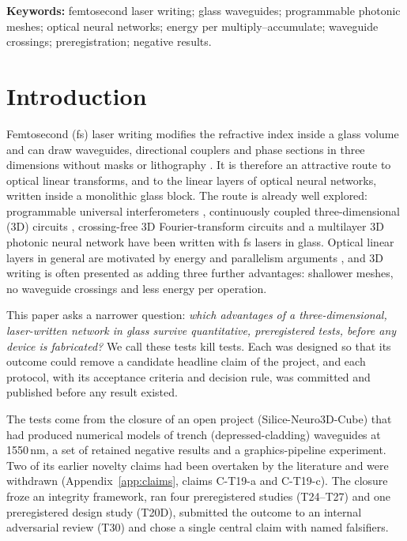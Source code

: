 \documentclass[11pt,a4paper]{article}
\begin{document}
\begin{titlepage}
\vspace{0.5cm}
\noindent\textbf{Keywords:} femtosecond laser writing; glass waveguides; programmable photonic meshes; optical neural networks; energy per multiply--accumulate; waveguide crossings; preregistration; negative results.
\end{titlepage}

\setcounter{tocdepth}{1}
\tableofcontents
\clearpage

\section{Introduction}
\label{sec:intro}

Femtosecond (fs) laser writing modifies the refractive index inside a glass volume and can draw waveguides, directional couplers and phase sections in three dimensions without masks or lithography \cite{Flamini2015,Ceccarelli2020,Pentangelo2024}. It is therefore an attractive route to optical linear transforms, and to the linear layers of optical neural networks, written inside a monolithic glass block. The route is already well explored: programmable universal interferometers \cite{Pentangelo2024,Kondratyev2024,Barzaghi2025}, continuously coupled three-dimensional (3D) circuits \cite{Hoch2022,DiMicco2026}, crossing-free 3D Fourier-transform circuits \cite{Crespi2016} and a multilayer 3D photonic neural network \cite{Cao2026} have been written with fs lasers in glass. Optical linear layers in general are motivated by energy and parallelism arguments \cite{Hamerly2019,McMahon2023}, and 3D writing is often presented as adding three further advantages: shallower meshes, no waveguide crossings and less energy per operation.

This paper asks a narrower question: \emph{which advantages of a three-dimensional, laser-written network in glass survive quantitative, preregistered tests, before any device is fabricated?} We call these tests kill tests. Each was designed so that its outcome could remove a candidate headline claim of the project, and each protocol, with its acceptance criteria and decision rule, was committed and published before any result existed.

The tests come from the closure of an open project (Silice-Neuro3D-Cube) that had produced numerical models of trench (depressed-cladding) waveguides at 1550\,nm, a set of retained negative results and a graphics-pipeline experiment. Two of its earlier novelty claims had been overtaken by the literature and were withdrawn (Appendix~\ref{app:claims}, claims C-T19-a and C-T19-c). The closure froze an integrity framework, ran four preregistered studies (T24--T27) and one preregistered design study (T20D), submitted the outcome to an internal adversarial review (T30) and chose a single central claim with named falsifiers.
\end{document}
